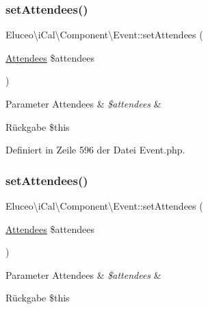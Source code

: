 \subsubsection{\texorpdfstring{set\+Attendees()}{setAttendees()}\hspace{0.1cm}{\footnotesize\ttfamily [1/3]}}
{\footnotesize\ttfamily Eluceo\textbackslash{}i\+Cal\textbackslash{}\+Component\textbackslash{}\+Event\+::set\+Attendees (\begin{DoxyParamCaption}\item[{\mbox{\hyperlink{class_eluceo_1_1i_cal_1_1_property_1_1_event_1_1_attendees}{Attendees}}}]{\$attendees }\end{DoxyParamCaption})}


\begin{DoxyParams}[1]{Parameter}
Attendees & {\em \$attendees} & \\
\hline
\end{DoxyParams}
\begin{DoxyReturn}{Rückgabe}
\$this 
\end{DoxyReturn}


Definiert in Zeile 596 der Datei Event.\+php.

\mbox{\label{class_eluceo_1_1i_cal_1_1_component_1_1_event_a3862ad4e3fc4d0f8d7086f4889b11bd7}} 
\subsubsection{\texorpdfstring{set\+Attendees()}{setAttendees()}\hspace{0.1cm}{\footnotesize\ttfamily [2/3]}}
{\footnotesize\ttfamily Eluceo\textbackslash{}i\+Cal\textbackslash{}\+Component\textbackslash{}\+Event\+::set\+Attendees (\begin{DoxyParamCaption}\item[{\mbox{\hyperlink{class_eluceo_1_1i_cal_1_1_property_1_1_event_1_1_attendees}{Attendees}}}]{\$attendees }\end{DoxyParamCaption})}


\begin{DoxyParams}[1]{Parameter}
Attendees & {\em \$attendees} & \\
\hline
\end{DoxyParams}
\begin{DoxyReturn}{Rückgabe}
\$this 
\end{DoxyReturn}


